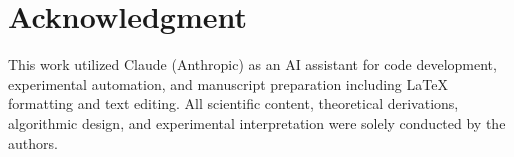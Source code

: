 \documentclass[journal]{IEEEtran}
\begin{document}
\section*{Acknowledgment}
This work utilized Claude (Anthropic) as an AI assistant for code development, experimental automation, and manuscript preparation including \LaTeX{} formatting and text editing. All scientific content, theoretical derivations, algorithmic design, and experimental interpretation were solely conducted by the authors.



\end{document}
